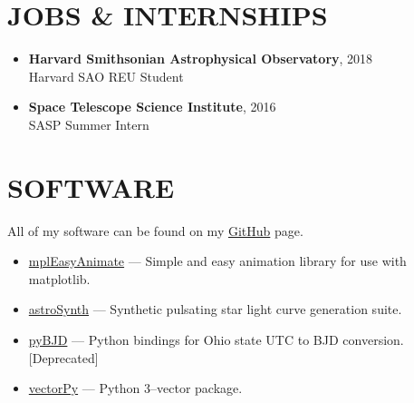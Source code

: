 \documentclass[margin, 10pt]{res} %
\begin{document}
\begin{resume}
\section{JOBS \& INTERNSHIPS}
\begin{itemize}
  \item \textbf{{\scriptsize Harvard Smithsonian Astrophysical Observatory}}, {\small 2018} \\Harvard SAO REU Student
  \item \textbf{{\scriptsize Space Telescope Science Institute}}, {\small 2016} \\SASP Summer Intern
\end{itemize}

\section{SOFTWARE}
All of my software can be found on my \href{https://github.com/tboudreaux}{GitHub} page.
\begin{itemize}
\item \href{https://github.com/tboudreaux/mpl_animate}{mplEasyAnimate} --- Simple and easy animation library for use with matplotlib.
\item \href{https://github.com/AstroSynth/astroSynth}{astroSynth} --- Synthetic pulsating star light curve generation suite.
\item \href{https://github.com/tboudreaux/pyBJD}{pyBJD} --- Python bindings for Ohio state UTC to BJD conversion. [Deprecated]
\item \href{https://github.com/tboudreaux/vectorpy}{vectorPy} --- Python 3--vector package.
\end{itemize}



\end{resume}
\end{document}
